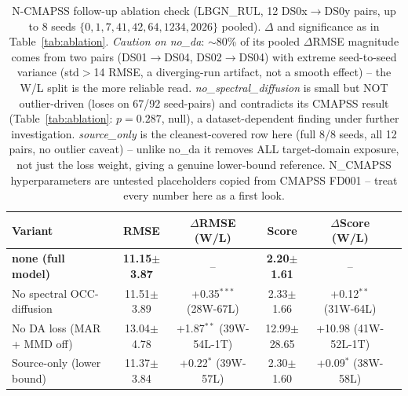 \begin{table}[t]
\centering
\caption{N-CMAPSS follow-up ablation check (LBGN\_RUL, 12 DS0x$\rightarrow$DS0y pairs, up to 8 seeds $\{0,1,7,41,42,64,1234,2026\}$ pooled). $\Delta$ and significance as in Table~\ref{tab:ablation}. \textit{Caution on no\_da}: $\sim$80\% of its pooled $\Delta$RMSE magnitude comes from two pairs (DS01$\rightarrow$DS04, DS02$\rightarrow$DS04) with extreme seed-to-seed variance (std$>$14 RMSE, a diverging-run artifact, not a smooth effect) -- the W/L split is the more reliable read. \textit{no\_spectral\_diffusion} is small but NOT outlier-driven (loses on 67/92 seed-pairs) and contradicts its CMAPSS result (Table~\ref{tab:ablation}: $p{=}0.287$, null), a dataset-dependent finding under further investigation. \textit{source\_only} is the cleanest-covered row here (full 8/8 seeds, all 12 pairs, no outlier caveat) -- unlike no\_da it removes ALL target-domain exposure, not just the loss weight, giving a genuine lower-bound reference. N\_CMAPSS hyperparameters are untested placeholders copied from CMAPSS FD001 -- treat every number here as a first look.}
\label{tab:ablation-ncmapss}
\begin{tabular}{lccccc}
\toprule
Variant & RMSE & $\Delta$RMSE (W/L) & Score & $\Delta$Score (W/L) \\
\midrule
\textbf{none (full model)} & \textbf{11.15$\pm$3.87} & -- & \textbf{2.20$\pm$1.61} & -- \\
\midrule
No spectral OCC-diffusion & 11.51$\pm$3.89 & +0.35$^{***}$ (28W-67L) & 2.33$\pm$1.66 & +0.12$^{**}$ (31W-64L) \\
No DA loss (MAR + MMD off) & 13.04$\pm$4.78 & +1.87$^{**}$ (39W-54L-1T) & 12.99$\pm$28.65 & +10.98 (41W-52L-1T) \\
Source-only (lower bound) & 11.37$\pm$3.84 & +0.22$^{*}$ (39W-57L) & 2.30$\pm$1.60 & +0.09$^{*}$ (38W-58L) \\
\bottomrule
\end{tabular}
\end{table}
